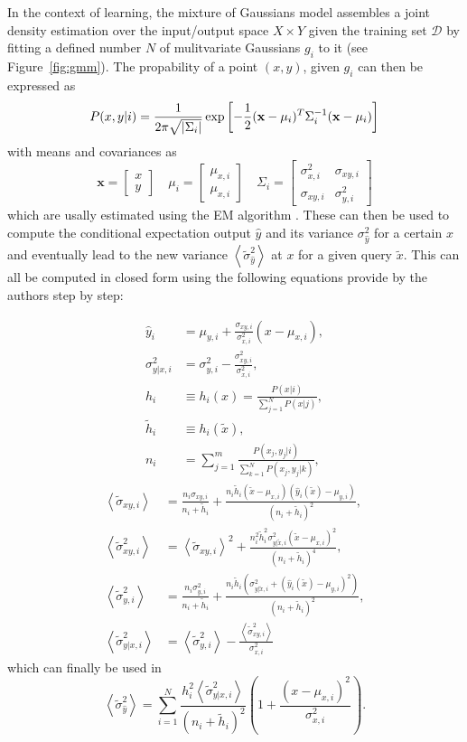 \documentclass{article}
\newcommand{\D}{\mathcal{D}}
\newcommand{\xt}{\tilde{x}}
\newcommand{\hht}{\tilde{h}}
\newcommand{\st}{\tilde{\sigma}}
\newcommand{\E}[1]{\left< #1 \right>}
\newcommand{\so}{\sigma_{\hat{y}}^2}
\newcommand{\sn}{\left< \tilde{\sigma}_{\hat{y}}^2 \right>}
\begin{document}
In the context of learning, the mixture of Gaussians model assembles a joint
density estimation over the input/output space $X \times Y$ given the training
set $\D$ by fitting a defined number $N$ of mulitvariate Gaussians $g_i$ to it
(see Figure~\ref{fig:gmm}). The propability of a point $(x,y)$, given $g_i$ can
then be expressed as
\begin{equation}\small
P(x,y|i) = \frac{1}{2\pi\sqrt{|\Sigma_i|}} \exp
\left[ -\frac{1}{2}(\mathbf{x}-\mu_i)^T\Sigma_i^{-1}(\mathbf{x}-\mu_i) \right]
\end{equation}
with means and covariances as
\[
\mathbf{x} = \left[ \begin{array}{c} x \\ y \end{array} \right] \quad
\mu_i = \left[ \begin{array}{c} \mu_{x,i} \\ \mu_{x,i} \end{array} \right] \quad
\Sigma_i = \left[ \begin{array}{cc} \sigma^2_{x,i} & \sigma_{xy,i} \\
    \sigma_{xy,i} & \sigma^2_{y,i} \end{array} \right]
\]
which are usally estimated using the EM algorithm \cite{dempster1977maximum}.
These can then be used to compute the conditional expectation output $\hat{y}$
and its variance $\so$ for a certain $x$ and eventually lead to the new variance
$\sn$ at $x$ for a given query $\xt$. This can all be computed in closed form
using the following equations provide by the authors step by step:

\[\begin{split}
 \hat{y}_i &= \mu_{y,i} + \frac{\sigma_{xy,i}}{\sigma_{x,i}^2}(x-\mu_{x,i}),\\
 \sigma_{y|x,i}^2 &= \sigma_{y,i}^2 - \frac{\sigma_{xy,i}^2}{\sigma_{x,i}^2},\\
 h_i &\equiv h_i(x) = \frac{P(x|i)}{\sum_{j=1}^N P(x|j)},\\
 \hht_i &\equiv h_i(\xt),\\
 n_i &= \sum_{j=1}^m \frac{P(x_j,y_j|i)}{\sum_{k=1}^N P(x_j,y_j|k)},
\end{split}\]
\[\begin{split}
 \E{\st_{xy,i}} &= \frac{n_i\sigma_{xy,i}}{n_i+\hht_i} + \frac{n_i\hht_i
    (\xt-\mu_{x,i})(\hat{y}_i(\xt)-\mu_{y,i})} {(n_i+\hht_i)^2},\\
 \E{\st_{xy,i}^2} &= \E{\st_{xy,i}}^2 +
   \frac{n_i^2\hht_i^2\sigma_{y|\xt,i}^2(\xt-\mu_{x,i})^2}{(n_i+\hht_i)^4},\\
 \E{\st_{y,i}^2} &= \frac{n_i\sigma_{y,i}^2}{n_i+\hht_i} +
   \frac{n_i\hht_i\left(\sigma_{y|\xt,i}^2 + (\hat{y}_i(\xt)-\mu_{y,i})^2 \right)}
   {(n_i+\hht_i)^2},\\
 \E{\st_{y|x,i}^2} &= \E{\st_{y,i}^2} - \frac{\E{\st_{xy,i}^2}}{\sigma_{x,i}^2}
\end{split}\]
which can finally be used in
\begin{equation}
   \E{\st_{\hat{y}}^2} = \sum_{i=1}^N
   \frac{h_i^2 \E{\st_{y|x,i}^2}}{ (n_i+\hht_i)^2}
   \left( 1+\frac{(x-\mu_{x,i})^2}{\sigma_{x,i}^2} \right).
\end{equation}
\end{document}
